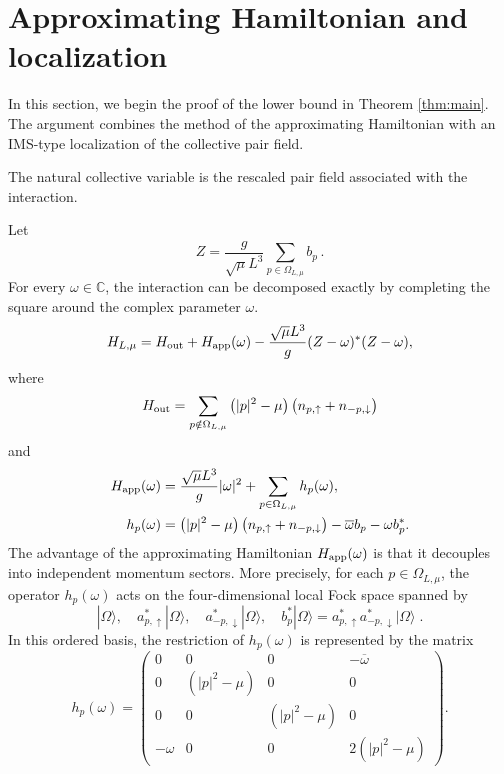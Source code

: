\documentclass[11pt]{amsart}
\theoremstyle{definition}
\numberwithin{equation}{section}
\newcommand{\C}{\mathbb C}
\newcommand{\1}{\mathbf 1}
\begin{document}
\section{Approximating Hamiltonian and localization}
\label{sec:approximating}
In this section, we begin the proof of the lower bound in Theorem \ref{thm:main}. The argument combines the method of the approximating Hamiltonian \cite{BogolRev} with an IMS-type localization of the collective pair field.

The natural collective variable is the rescaled pair field associated with the interaction.

Let
\begin{equation}\label{eq:Z-def}
 Z=\frac{g}{\sqrt{\mu}L^3}\sum_{p \in \Omega_{L, \mu}}b_p\,.
\end{equation}
For every \(\omega\in\C\), the interaction can be decomposed exactly by completing the square around the complex parameter $\omega$. 
\begin{equation}\label{eq:square-completion}
 H_{L,\mu}
 =
 H_{\rm out}+H_{\rm app}(\omega)
 -\frac{\sqrt{\mu}L^3}{g}
 (Z-\omega)^*(Z-\omega),
\end{equation}
where
\begin{equation}\label{eq:H-out}
 H_{\rm out}
 =
 \sum_{p\notin\Omega_{L,\mu}}
 \left(|p|^2 - \mu \right)\bigl(n_{p,\uparrow}+n_{-p,\downarrow}\bigr)
\end{equation}
and
\begin{align}
 H_{\rm app}(\omega)
 &=
 \frac{\sqrt{\mu}L^3}{g}|\omega|^2
 +\sum_{p\in\Omega_{L,\mu}}h_p(\omega),
 \label{eq:H-app}\\
 h_p(\omega)
 &=
 \left(|p|^2 - \mu \right)\bigl(n_{p,\uparrow}+n_{-p,\downarrow}\bigr)
 -\overline\omega b_p-\omega b_p^*.
 \label{eq:h-p}
\end{align}
The advantage of the approximating Hamiltonian $H_{\rm app}(\omega)$ is that it decouples into independent momentum sectors. More precisely, for each $p\in\Omega_{L,\mu}$, the operator $h_p(\omega)$ acts on the four-dimensional local Fock space spanned by
\begin{equation*}
    |\Omega\rangle, \quad a^*_{p, \uparrow}|\Omega\rangle, \quad a^*_{-p, \downarrow}|\Omega\rangle, \quad b^*_p|\Omega\rangle = a^*_{p, \uparrow} a^*_{-p, \downarrow}|\Omega\rangle\;.
\end{equation*} 
In this ordered basis, the restriction of $h_p(\omega)$ is represented by the matrix
\begin{equation}\label{eq:local-matrix}
 h_p(\omega)
 =
 \begin{pmatrix}
 0&0&0&-\overline\omega\\
 0&\left(|p|^2 - \mu \right)&0&0\\
 0&0&\left(|p|^2 - \mu \right)&0\\
 -\omega&0&0&2\left(|p|^2 - \mu \right)
 \end{pmatrix}.
\end{equation}
\end{document}
